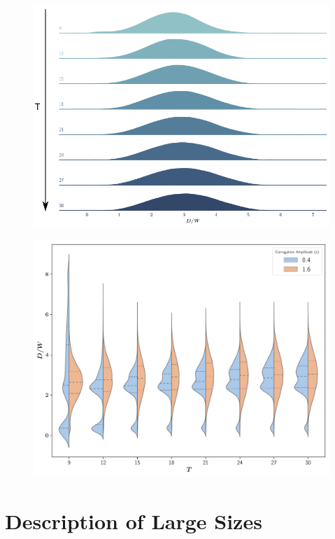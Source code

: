 \begin{figure}
\centering
\includegraphics{plots/drop_stats/large_amp.pdf}
	\caption{\blindtext}
\label{tseries_large}
\end{figure}



\begin{figure}
\centering
\includegraphics{plots/drop_stats/amp_dist_compare.pdf}
	\caption{\blindtext}
\label{tseries_comp}
\end{figure}


\section{Description of Large Sizes}


